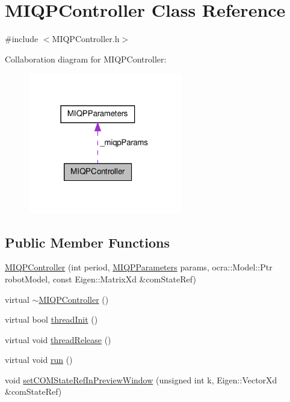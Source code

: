 \hypertarget{classMIQPController}{\section{\-M\-I\-Q\-P\-Controller \-Class \-Reference}
\label{classMIQPController}
}


{\ttfamily \#include $<$\-M\-I\-Q\-P\-Controller.\-h$>$}



\-Collaboration diagram for \-M\-I\-Q\-P\-Controller\-:
\nopagebreak
\begin{figure}[H]
\begin{center}
\leavevmode
\includegraphics[width=190pt]{classMIQPController__coll__graph}
\end{center}
\end{figure}
\subsection*{\-Public \-Member \-Functions}
\begin{DoxyCompactItemize}
\item 
\hyperlink{classMIQPController_a73b26ce1edd4ab839826abedcc72a475}{\-M\-I\-Q\-P\-Controller} (int period, \hyperlink{structMIQPParameters}{\-M\-I\-Q\-P\-Parameters} params, ocra\-::\-Model\-::\-Ptr robot\-Model, const \-Eigen\-::\-Matrix\-Xd \&com\-State\-Ref)
\item 
virtual \hyperlink{classMIQPController_a46e1cc8dba1633a49d934aa20730e358}{$\sim$\-M\-I\-Q\-P\-Controller} ()
\item 
virtual bool \hyperlink{classMIQPController_a7e82a26dc823c7f69d00997d0ca98052}{thread\-Init} ()
\item 
virtual void \hyperlink{classMIQPController_a43faa045ed47859b04f39e99805888c1}{thread\-Release} ()
\item 
virtual void \hyperlink{classMIQPController_aa8fd8452a14d8e7731bf45044e1c7a59}{run} ()
\item 
void \hyperlink{classMIQPController_a69b193f0aab0fa0d0ec439b4d1b2a65f}{set\-C\-O\-M\-State\-Ref\-In\-Preview\-Window} (unsigned int k, \-Eigen\-::\-Vector\-Xd \&com\-State\-Ref)
\end{DoxyCompactItemize}
